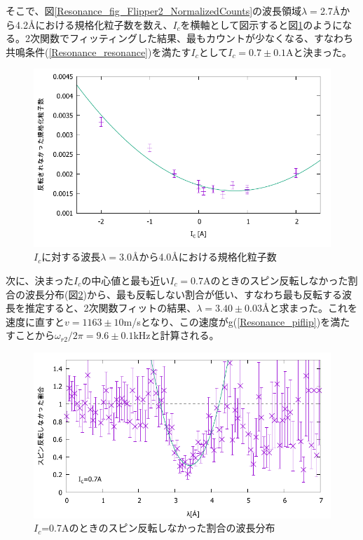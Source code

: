 そこで、図\ref{Resonance_fig_Flipper2_NormalizedCounts}の波長領域$\lambda=$2.7{\AA}から4.2{\AA}における規格化粒子数を数え、$I_c$を横軸として図示すると図\ref{Resonance_fig_Flipper2_Cur}のようになる。2次関数でフィッティングした結果、最もカウントが少なくなる、すなわち共鳴条件(\ref{Resonance_resonance})を満たす$I_c$として$I_c=0.7\pm0.1$Aと決まった。
\begin{figure}[h]
\centering
\includegraphics[width=12cm]{resonance/analysis/Flipper2_Cur_30-40.pdf}
\caption{$I_c$に対する波長$\lambda=$3.0{\AA}から4.0{\AA}における規格化粒子数}\label{Resonance_fig_Flipper2_Cur}
\end{figure}

次に、決まった$I_c$の中心値と最も近い$I_c=0.7$Aのときのスピン反転しなかった割合の波長分布(図\ref{Resonance_fig_Flipper2_CountsRate_7fit})から、最も反転しない割合が低い、すなわち最も反転する波長を推定すると、2次関数フィットの結果、$\lambda=3.40\pm0.03${\AA}と求まった。これを速度に直すと$v=1163\pm10$m/sとなり、この速度がg(\ref{Resonance_piflip})を満たすことから$\omega_{r2}/2\pi=9.6\pm0.1$kHzと計算される。
\begin{figure}[h]
\centering
\includegraphics[width=12cm]{resonance/analysis/Flipper2_CountsRate_7A_fit.pdf}
\caption{$I_c$=0.7Aのときのスピン反転しなかった割合の波長分布}\label{Resonance_fig_Flipper2_CountsRate_7fit}
\end{figure}

